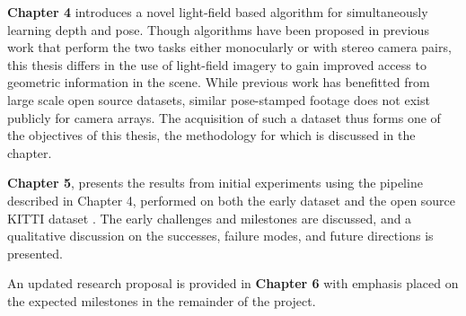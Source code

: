 \textbf{Chapter 4} introduces a novel light-field based algorithm for simultaneously learning depth and pose. Though algorithms have been proposed in previous work that perform the two tasks either monocularly or with stereo camera pairs, this thesis differs in the use of light-field imagery to gain improved access to geometric information in the scene. While previous work has benefitted from large scale open source datasets, similar pose-stamped footage does not exist publicly for camera arrays. The acquisition of such a dataset thus forms one of the objectives of this thesis, the methodology for which is discussed in the chapter.

\textbf{Chapter 5}, presents the results from initial experiments using the pipeline described in Chapter 4, performed on both the early dataset and the open source KITTI dataset \cite{dataset-kitti}. The early challenges and milestones are discussed, and a qualitative discussion on the successes, failure modes, and future directions is presented. 

An updated research proposal is provided in \textbf{Chapter 6} with emphasis placed on the expected milestones in the remainder of the project. 